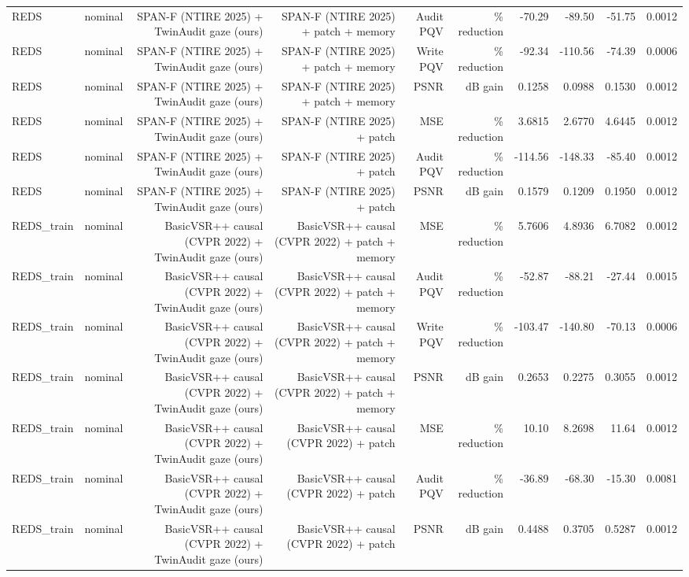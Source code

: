 \begin{table}[t]
\begin{tabular}{llrrrrrrrr}
REDS & nominal & SPAN-F (NTIRE 2025) + TwinAudit gaze (ours) & SPAN-F (NTIRE 2025) + patch + memory & Audit PQV & \% reduction & -70.29 & -89.50 & -51.75 & 0.0012 \\
REDS & nominal & SPAN-F (NTIRE 2025) + TwinAudit gaze (ours) & SPAN-F (NTIRE 2025) + patch + memory & Write PQV & \% reduction & -92.34 & -110.56 & -74.39 & 0.0006 \\
REDS & nominal & SPAN-F (NTIRE 2025) + TwinAudit gaze (ours) & SPAN-F (NTIRE 2025) + patch + memory & PSNR & dB gain & 0.1258 & 0.0988 & 0.1530 & 0.0012 \\
REDS & nominal & SPAN-F (NTIRE 2025) + TwinAudit gaze (ours) & SPAN-F (NTIRE 2025) + patch & MSE & \% reduction & 3.6815 & 2.6770 & 4.6445 & 0.0012 \\
REDS & nominal & SPAN-F (NTIRE 2025) + TwinAudit gaze (ours) & SPAN-F (NTIRE 2025) + patch & Audit PQV & \% reduction & -114.56 & -148.33 & -85.40 & 0.0012 \\
REDS & nominal & SPAN-F (NTIRE 2025) + TwinAudit gaze (ours) & SPAN-F (NTIRE 2025) + patch & PSNR & dB gain & 0.1579 & 0.1209 & 0.1950 & 0.0012 \\
REDS\_train & nominal & BasicVSR++ causal (CVPR 2022) + TwinAudit gaze (ours) & BasicVSR++ causal (CVPR 2022) + patch + memory & MSE & \% reduction & 5.7606 & 4.8936 & 6.7082 & 0.0012 \\
REDS\_train & nominal & BasicVSR++ causal (CVPR 2022) + TwinAudit gaze (ours) & BasicVSR++ causal (CVPR 2022) + patch + memory & Audit PQV & \% reduction & -52.87 & -88.21 & -27.44 & 0.0015 \\
REDS\_train & nominal & BasicVSR++ causal (CVPR 2022) + TwinAudit gaze (ours) & BasicVSR++ causal (CVPR 2022) + patch + memory & Write PQV & \% reduction & -103.47 & -140.80 & -70.13 & 0.0006 \\
REDS\_train & nominal & BasicVSR++ causal (CVPR 2022) + TwinAudit gaze (ours) & BasicVSR++ causal (CVPR 2022) + patch + memory & PSNR & dB gain & 0.2653 & 0.2275 & 0.3055 & 0.0012 \\
REDS\_train & nominal & BasicVSR++ causal (CVPR 2022) + TwinAudit gaze (ours) & BasicVSR++ causal (CVPR 2022) + patch & MSE & \% reduction & 10.10 & 8.2698 & 11.64 & 0.0012 \\
REDS\_train & nominal & BasicVSR++ causal (CVPR 2022) + TwinAudit gaze (ours) & BasicVSR++ causal (CVPR 2022) + patch & Audit PQV & \% reduction & -36.89 & -68.30 & -15.30 & 0.0081 \\
REDS\_train & nominal & BasicVSR++ causal (CVPR 2022) + TwinAudit gaze (ours) & BasicVSR++ causal (CVPR 2022) + patch & PSNR & dB gain & 0.4488 & 0.3705 & 0.5287 & 0.0012 \\

\end{tabular}
\end{table}
